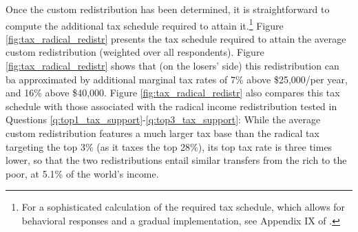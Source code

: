 Once the custom redistribution has been determined, it is straightforward to compute the additional tax schedule required to attain it.\footnote{For a sophisticated calculation of the required tax schedule, which allows for behavioral responses and a gradual implementation, see Appendix IX of \cite{fabre_french_2022}.} Figure \ref{fig:tax_radical_redistr} presents the tax schedule required to attain the average custom redistribution (weighted over all respondents). Figure \ref{fig:tax_radical_redistr} shows that (on the losers' side) this redistribution can ba approximated by additional marginal tax rates of 7\% above \$25,000/per year, and 16\% above \$40,000. Figure \ref{fig:tax_radical_redistr} also compares this tax schedule with those associated with the radical income redistribution tested in Questions \ref{q:top1_tax_support}-\ref{q:top3_tax_support}: While the average custom redistribution features a much larger tax base than the radical tax targeting the top 3\% (as it taxes the top 28\%), its top tax rate is three times lower, so that the two redistributions entail similar transfers from the rich to the poor, at 5.1\% of the world's income. %

